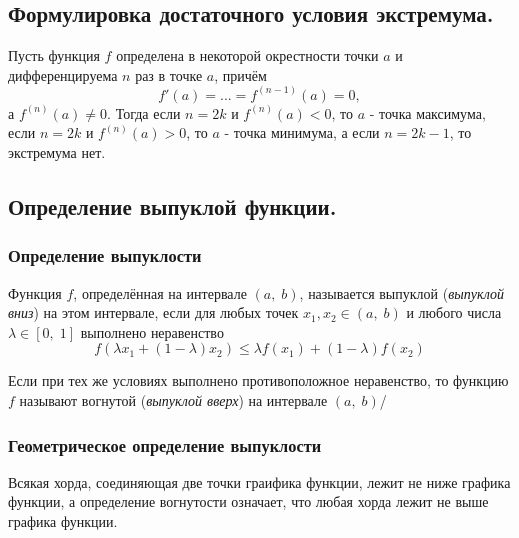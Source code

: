 

\label{sec_Definition18}
\begin{definition}
    \subsection*{Формулировка достаточного условия экстремума.}
    \begin{note}[purple]
        Пусть функция $f$ определена в некоторой окрестности точки $a$ и дифференцируема $n$ 
        раз в точке $a$, причём 
        $$ f'(a) = ... = f^{(n - 1)}(a) = 0, $$
        а $f^{(n)}(a) \neq 0$. Тогда если $n = 2k$ и $f^{(n)}(a) < 0$, то $a$ - точка максимума,
        если $n = 2k$ и $f^{(n)}(a) > 0$, то $a$ - точка минимума, а если $n = 2k - 1$, то
        экстремума нет.
    \end{note}

    \subsection*{Определение выпуклой функции.}
    \begin{note}[purple]
        \subsubsection*{Определение выпуклости}
        Функция $f$, определённая на интервале $(a, \; b)$, называется выпуклой 
        (\textit{выпуклой вниз}) на этом интервале, если для любых точек $x_1, x_2 \in (a, \; b)$
        и любого числа $\lambda \in [0, \; 1]$ выполнено неравенство
        $$ f(\lambda x_1 + (1 - \lambda)x_2) \leq \lambda f(x_1) + (1 - \lambda) f(x_2) $$

        Если при тех же условиях выполнено противоположное неравенство, то функцию $f$ называют
        вогнутой (\textit{выпуклой вверх}) на интервале $(a, \; b)$/

        \subsubsection*{Геометрическое определение выпуклости}
        Всякая хорда, соединяющая две точки граифика функции, лежит не ниже графика функции,
        а определение вогнутости означает, что любая хорда лежит не выше графика функции.
    \end{note}


\end{definition}
